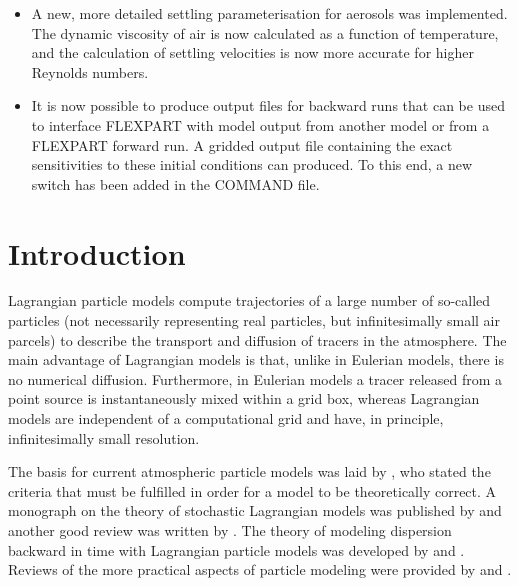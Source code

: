\documentclass{egu}            %
\begin{document}
\begin{itemize}

\item A new, more detailed settling parameterisation for aerosols was
implemented.  The dynamic viscosity of air is now calculated as a function of
temperature, and the calculation of settling velocities is now more accurate
for higher Reynolds numbers.

\item It is now possible to produce output files for backward runs that can be used
to interface FLEXPART with model output from another model or from a FLEXPART
forward run.  A gridded output file containing the exact sensitivities to these
initial conditions can produced.  To this end, a new switch has been added in
the COMMAND file.

\end{itemize}

\section{Introduction}

Lagrangian particle models compute trajectories of a large number of so-called
particles (not necessarily representing real particles, but infinitesimally
small air parcels) to describe the transport and diffusion of tracers in the
atmosphere.  The main advantage of Lagrangian models is that, unlike in
Eulerian models, there is no numerical diffusion.  Furthermore, in Eulerian
models a tracer released from a point source is instantaneously mixed within a
grid box, whereas Lagrangian models are independent of a computational grid and
have, in principle, infinitesimally small resolution.

The basis for current atmospheric particle models was laid by
\citet{thomson1987}, who stated the criteria that must be fulfilled in order
for a model to be theoretically correct.  A monograph on the theory of
stochastic Lagrangian models was published by \citet{rodean1996} and another
good review was written by \citet{wilson1996}.  The theory of modeling
dispersion backward in time with Lagrangian particle models was developed by
\citet{flesch1995} and \citet{seibert2004}.  Reviews of the more practical
aspects of particle modeling were provided by \citet{zannetti1992} and
\citet{uliasz1994}.
\end{document}

